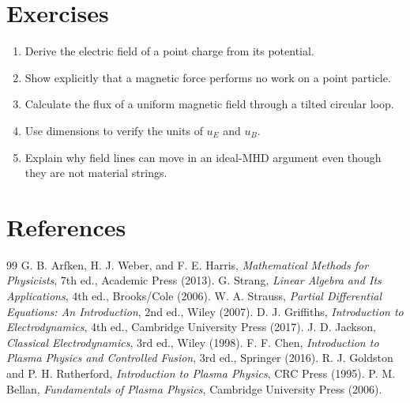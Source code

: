 \documentclass[11pt]{article}
\begin{document}
\section{Exercises}
\begin{enumerate}[leftmargin=1.8em]
\item Derive the electric field of a point charge from its potential.
\item Show explicitly that a magnetic force performs no work on a point particle.
\item Calculate the flux of a uniform magnetic field through a tilted circular loop.
\item Use dimensions to verify the units of $u_E$ and $u_B$.
\item Explain why field lines can move in an ideal-MHD argument even though they are not material strings.
\end{enumerate}

\section{References}
\begin{thebibliography}{99}
 G. B. Arfken, H. J. Weber, and F. E. Harris, \emph{Mathematical Methods for Physicists}, 7th ed., Academic Press (2013).
 G. Strang, \emph{Linear Algebra and Its Applications}, 4th ed., Brooks/Cole (2006).
 W. A. Strauss, \emph{Partial Differential Equations: An Introduction}, 2nd ed., Wiley (2007).
 D. J. Griffiths, \emph{Introduction to Electrodynamics}, 4th ed., Cambridge University Press (2017).
 J. D. Jackson, \emph{Classical Electrodynamics}, 3rd ed., Wiley (1998).
 F. F. Chen, \emph{Introduction to Plasma Physics and Controlled Fusion}, 3rd ed., Springer (2016).
 R. J. Goldston and P. H. Rutherford, \emph{Introduction to Plasma Physics}, CRC Press (1995).
 P. M. Bellan, \emph{Fundamentals of Plasma Physics}, Cambridge University Press (2006).
\end{thebibliography}
\end{document}
